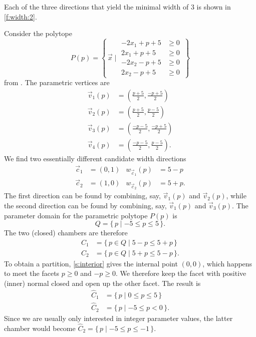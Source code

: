 \begin{example}
Each of the three directions that yield the minimal
width of 3 is shown in \autoref{f:width:2}.
\end{example}

\begin{example}
Consider the polytope
$$
P(p) = \left\{\,
\vec x \mid
\begin{aligned}
-2 x_1 + p + 5 &\ge 0 \\
2 x_1 + p + 5 &\ge 0 \\
-2 x_2 - p + 5 &\ge 0 \\
2 x_2 - p + 5 &\ge 0
\end{aligned}
\,\right\}
$$
from .
The parametric vertices are
$$
\begin{aligned}
\vec v_1(p) & = \left(\frac{p+5}2, \frac{-p+5}2\right) \\
\vec v_2(p) & = \left(\frac{p+5}2, \frac{p-5}2\right) \\
\vec v_3(p) & = \left(\frac{-p-5}2, \frac{-p+5}2\right) \\
\vec v_4(p) & = \left(\frac{-p-5}2, \frac{p-5}2\right)
.
\end{aligned}
$$
We find two essentially different candidate width directions
$$
\begin{aligned}
\vec c_1 &= (0,1) & w_{\vec c_1}(p) &= 5-p \\
\vec c_2 &= (1,0) & w_{\vec c_2}(p) &= 5+p
.
\end{aligned}
$$
The first direction can be found by combining, say,
$\vec v_1(p)$ and $\vec v_2(p)$, while the second direction can be
found by combining, say, $\vec v_1(p)$ and $\vec v_3(p)$.
The parameter domain for the parametric polytope $P(p)$ is
$$
Q = \{\, p \mid -5 \le p \le 5 \,\}
.
$$
The two (closed) chambers are therefore
$$
\begin{aligned}
C_1 &= \{\, p \in Q \mid 5 - p \le 5+p \,\} \\
C_2 &= \{\, p \in Q \mid 5 + p \le 5-p \,\}
.
\end{aligned}
$$
To obtain a partition, \autoref{s:interior} gives
the internal point $(0,0)$, which happens to meet
the facets $p \ge 0$ and $-p \ge 0$.  We therefore
keep the facet with positive (inner) normal closed
and open up the other facet.  The result is
$$
\begin{aligned}
\hat C_1 &= \{\, p \mid 0 \le p \le 5 \,\} \\
\hat C_2 &= \{\, p \mid -5 \le p < 0 \,\}
.
\end{aligned}
$$
Since we are usually only interested in integer parameter
values, the latter chamber would become
$\hat C_2 = \{\, p \mid -5 \le p \le -1 \,\}$.
\end{example}

